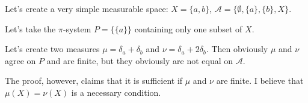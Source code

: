 \documentclass[12pt]{article}
\begin{document}
Let's create a very simple measurable space: $X=\{a,b\}$, $\mathcal{A}=\{\emptyset, \{a\}, \{b\}, X\}$. 

Let's take the $\pi$-system $P=\{\{a\}\}$ containing only one subset of $X$. 

Let's create two measures $\mu = \delta_a + \delta_b$ and $\nu = \delta_a + 2\delta_b$. Then obviously $\mu$ and $\nu$ agree on $P$ and are finite, but they obviously are not equal on $\mathcal{A}$.

The proof, however, claims that it is sufficient if $\mu$ and $\nu$ are finite. I believe that $\mu(X)=\nu(X)$ is a necessary condition.
\end{document}
